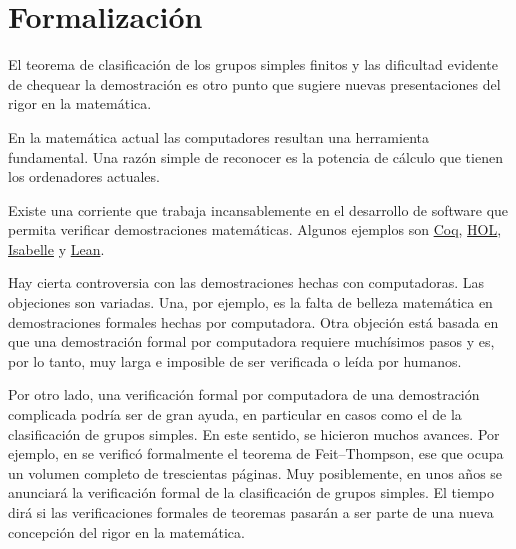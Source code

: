 


\section*{Formalización}

El teorema de clasificación de los grupos simples finitos y las dificultad
evidente de chequear la demostración es otro punto que sugiere nuevas presentaciones
del rigor en la matemática. 

En la matemática actual las computadores resultan una herramienta fundamental. Una razón 
simple de reconocer es la potencia de cálculo que tienen los ordenadores actuales. 

Existe una corriente que trabaja incansablemente en el desarrollo de software  
que permita verificar demostraciones matemáticas. Algunos ejemplos son 
\href{https://coq.inria.fr/}{Coq}, \href{https://hol-theorem-prover.org/}{HOL}, 
\href{https://isabelle.in.tum.de/}{Isabelle} 
y \href{https://leanprover.github.io/}{Lean}. 

Hay cierta controversia con las demostraciones hechas con computadoras. Las objeciones
son variadas. Una, por ejemplo, es la 
falta de belleza matemática en demostraciones formales hechas por computadora. Otra
objeción está basada en que una demostración formal por computadora requiere muchísimos pasos
y es, por lo tanto, muy larga e imposible de ser verificada o leída por humanos. 

Por otro lado, una verificación formal por computadora de una demostración complicada
podría ser de gran ayuda, en particular en casos como el de la clasificación de grupos
simples. En este sentido, se hicieron muchos avances. Por ejemplo, 
en se verificó formalmente el teorema de Feit--Thompson, ese que ocupa un volumen
completo de trescientas páginas. Muy posiblemente, en unos años 
se anunciará la verificación formal de la clasificación de grupos simples. El tiempo 
dirá si las verificaciones formales de teoremas pasarán a ser parte de una nueva concepción
del rigor en la matemática. 


